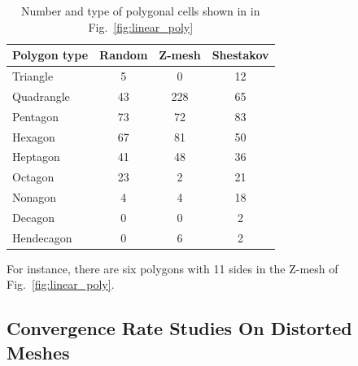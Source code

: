 \documentclass[preprint,10pt]{elsarticle}
\newcommand{\fig}[1]{Fig.~\ref{#1}}                      %
\begin{document}
\begin{table}[htbp]
	\centering
		\begin{tabular}{|l||c|c|c|}
		\hline
		Polygon type       &Random              & Z-mesh & Shestakov  \\ \hline\hline
Triangle  &   5 &  0 & 12 \\ \hline
Quadrangle&  43 & 228& 65 \\ \hline
Pentagon  &  73 & 72 & 83 \\ \hline
Hexagon   &  67 & 81 & 50 \\ \hline
Heptagon  &  41 & 48 & 36 \\ \hline
Octagon   &  23 & 2  & 21 \\ \hline
Nonagon   &   4 & 4  & 18 \\ \hline
Decagon   &   0 & 0  &  2 \\ \hline
Hendecagon&   0 & 6  &  2 \\ \hline		
		\end{tabular}
	\caption{Number and type of polygonal cells shown in in \fig{fig:linear_poly}}
	\label{tab:poly_cell_types_linear_poly}
\end{table}

For instance, there are six polygons with 11 sides in the Z-mesh of \fig{fig:linear_poly}.

\subsection{Convergence Rate Studies On Distorted Meshes}
\end{document}
